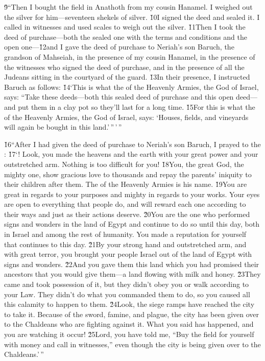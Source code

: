 \v{9}``Then I bought the field in Anathoth from my cousin Hanamel. I weighed out the silver for him---seventeen shekels of silver. \v{10}I signed the deed and sealed it. I called in witnesses and used scales to weigh out the silver. \v{11}Then I took the deed of purchase---both the sealed one with the terms and conditions and the open one---\v{12}and I gave the deed of purchase to Neriah's son Baruch, the grandson of Mahseiah, in the presence of my cousin Hanamel, in the presence of the witnesses who signed the deed of purchase, and in the presence of all the Judeans sitting in the courtyard of the guard. \v{13}In their presence, I instructed Baruch as follows: \v{14}`This is what the  of the Heavenly Armies, the God of Israel, says: ``Take these deeds---both this sealed deed of purchase and this open deed---and put them in a clay pot so they'll last for a long time. \v{15}For this is what the  of the Heavenly Armies, the God of Israel, says: `Houses, fields, and vineyards will again be bought in this land.'\,''\,'\,''

\v{16}``After I had given the deed of purchase to Neriah's son Baruch, I prayed to the : \v{17}`! Look, you made the heavens and the earth with your great power and your outstretched arm. Nothing is too difficult for you! \v{18}You, the great God, the mighty one, show gracious love to thousands and repay the parents' iniquity to their children after them. The  of the Heavenly Armies is his name. \v{19}You are great in regards to your purposes and mighty in regards to your works. Your eyes are open to everything that people do, and will reward each one according to their ways and just as their actions deserve. \v{20}You are the one who performed signs and wonders in the land of Egypt and continue to do so until this day, both in Israel and among the rest of humanity. You made a reputation for yourself that continues to this day. \v{21}By your strong hand and outstretched arm, and with great terror, you brought your people Israel out of the land of Egypt with signs and wonders. \v{22}And you gave them this land which you had promised their ancestors that you would give them---a land flowing with milk and honey. \v{23}They came and took possession of it, but they didn't obey you or walk according to your Law. They didn't do what you commanded them to do, so you caused all this calamity to happen to them. \v{24}Look, the siege ramps have reached the city to take it. Because of the sword, famine, and plague, the city has been given over to the Chaldeans who are fighting against it. What you said has happened, and you are watching it occur! \v{25}Lord, you have told me, ``Buy the field for yourself with money and call in witnesses,'' even though the city is being given over to the Chaldeans.'\,''

